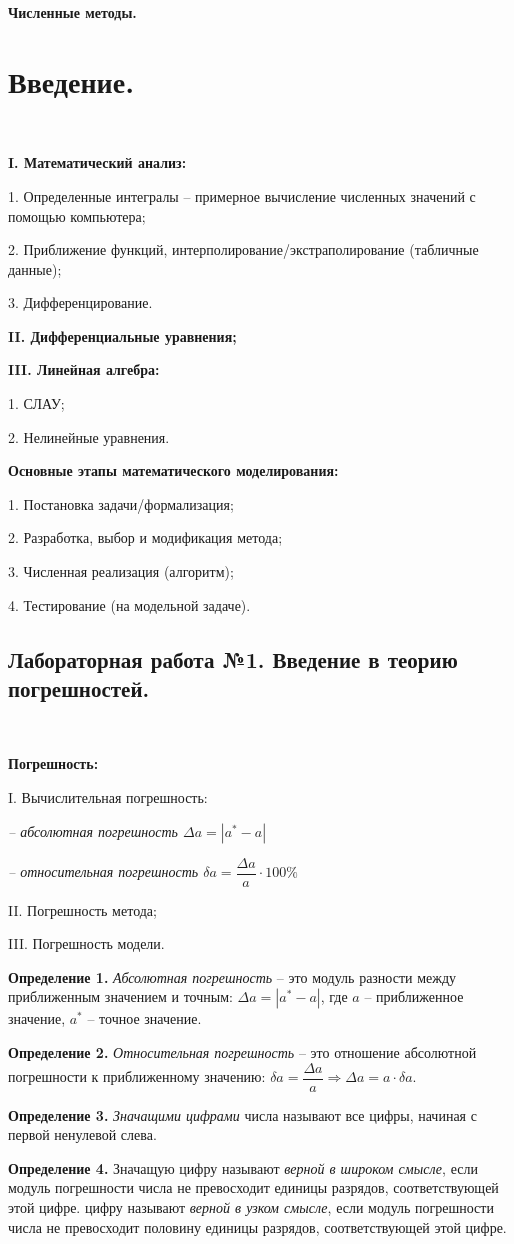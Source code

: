 \documentclass[9pt]{article}
\begin{document}
\begin{center}
    \huge\textbf{Численные методы.}
\end{center}

\section{Введение.}

\ 
\par\textbf{I. Математический анализ:}
\par1. Определенные интегралы -- примерное вычисление численных значений с помощью компьютера;
\par2. Приближение функций, интерполирование/экстраполирование (табличные данные);
\par3. Дифференцирование.
\par\textbf{II. Дифференциальные уравнения;}
\par\textbf{III. Линейная алгебра:}
\par1. СЛАУ;
\par2. Нелинейные уравнения.

\par\textbf{Основные этапы математического моделирования:}
\par1. Постановка задачи/формализация;
\par2. Разработка, выбор и модификация метода;
\par3. Численная реализация (алгоритм);
\par4. Тестирование (на модельной задаче).

\subsection{Лабораторная работа №1. Введение в теорию погрешностей.}

\ 
\par\textbf{Погрешность:}
\par I. Вычислительная погрешность:
\par\textit{-- абсолютная погрешность \(\Delta a = |a^* - a|\)}
\par\textit{-- относительная погрешность \(\delta a = \dfrac{\Delta a}{a} \cdot 100\% \)}
\par II. Погрешность метода;
\par III. Погрешность модели.
\par\textbf{Определение 1.} \textit{Абсолютная погрешность} -- это модуль разности между приближенным значением и точным: \(\Delta a = |a^* - a|\), где \(a\) -- приближенное значение, \(a^*\) -- точное значение.
\par\textbf{Определение 2.} \textit{Относительная погрешность} -- это отношение абсолютной погрешности к приближенному значению: \(\delta a = \dfrac{\Delta a}{a} \Rightarrow \Delta a = a \cdot \delta a\).
\par\textbf{Определение 3.} \textit{Значащими цифрами} числа называют все цифры, начиная с первой ненулевой слева.
\par\textbf{Определение 4.} Значащую цифру называют \textit{верной в широком смысле}, если модуль погрешности числа не превосходит единицы разрядов, соответствующей этой цифре.
\parЗначащую цифру называют \textit{верной в узком смысле}, если модуль погрешности числа не превосходит половину единицы разрядов, соответствующей этой цифре.
\end{document}
